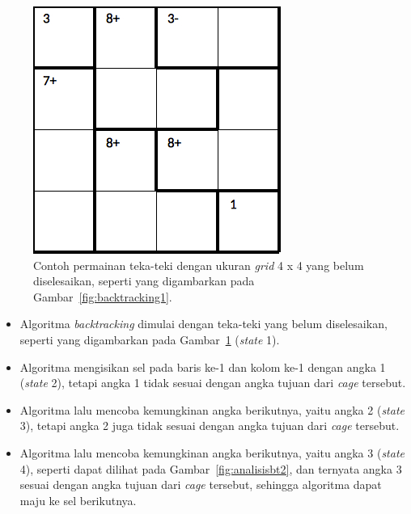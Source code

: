 \documentclass[a4paper,twoside]{article}
\begin{document}
\begin{enumerate}
\begin{figure}
\centering
\captionsetup{justification=centering}
\includegraphics[scale=0.333]{Gambar/backtracking/State1}
\caption[Contoh permainan teka-teki Calcudoku dengan ukuran \textit{grid} 4 x 4 yang belum diselesaikan, seperti yang digambarkan pada Gambar~\ref{fig:backtracking1}.  ~\cite{Fahda}]{Contoh permainan teka-teki dengan ukuran \textit{grid} 4 x 4 yang belum diselesaikan, seperti yang digambarkan pada Gambar~\ref{fig:backtracking1}.  ~\cite{Fahda}}
\label{fig:analisisbt1}
\end{figure}

\begin{itemize}
\item Algoritma \textit{backtracking} dimulai dengan teka-teki yang belum diselesaikan, seperti yang digambarkan pada Gambar~\ref{fig:analisisbt1} (\textit{state} 1).
\item Algoritma mengisikan sel pada baris ke-1 dan kolom ke-1 dengan angka 1 (\textit{state} 2), tetapi angka 1 tidak sesuai dengan angka tujuan dari \textit{cage} tersebut.
\item Algoritma lalu mencoba kemungkinan angka berikutnya, yaitu angka 2 (\textit{state} 3), tetapi angka 2 juga tidak sesuai dengan angka tujuan dari \textit{cage} tersebut.
\item Algoritma lalu mencoba kemungkinan angka berikutnya, yaitu angka 3 (\textit{state} 4), seperti dapat dilihat pada Gambar~\ref{fig:analisisbt2}, dan ternyata angka 3 sesuai dengan angka tujuan dari \textit{cage} tersebut, sehingga algoritma dapat maju ke sel berikutnya.


\end{itemize}
\end{enumerate}
\end{document}
